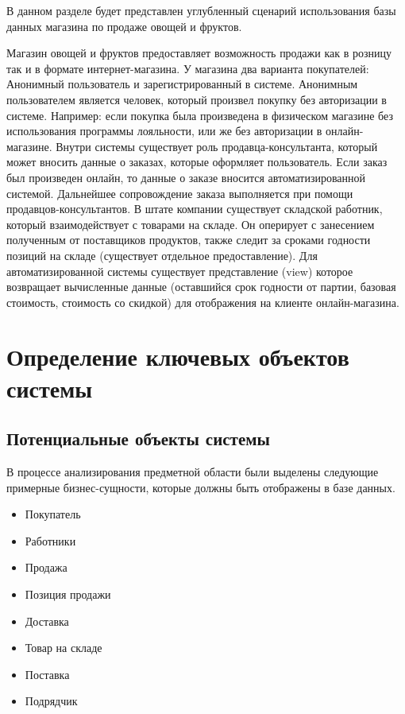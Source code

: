 \documentclass[14pt]{extreport}
\begin{document}
В данном разделе будет представлен углубленный сценарий использования базы данных магазина по продаже овощей и фруктов.


Магазин овощей и фруктов предоставляет возможность продажи как в розницу так и в формате интернет-магазина. У магазина два варианта покупателей: Анонимный пользователь и зарегистрированный в системе. Анонимным пользователем является человек, который произвел покупку без авторизации в системе. Например: если покупка была произведена в физическом магазине без использования программы лояльности, или же без авторизации в онлайн-магазине. Внутри системы существует роль продавца-консультанта, который может вносить данные о заказах, которые оформляет пользователь. Если заказ был произведен онлайн, то данные о заказе вносится автоматизированной системой. Дальнейшее сопровождение заказа выполняется при помощи продавцов-консультантов. В штате компании существует складской работник, который взаимодействует с товарами на складе. Он оперирует с занесением полученным от поставщиков продуктов, также следит за сроками годности позиций на складе (существует отдельное предоставление). Для автоматизированной системы существует представление (view) которое возвращает вычисленные данные (оставшийся срок годности от партии, базовая стоимость, стоимость со скидкой) для отображения на клиенте онлайн-магазина.

\chapter{Определение ключевых объектов системы}

    \section{Потенциальные объекты системы}
        В процессе анализирования предметной области были выделены следующие примерные бизнес-сущности, которые должны быть отображены в базе данных.

        \begin{itemize}
            \item Покупатель
            \item Работники
            \item Продажа
            \item Позиция продажи
            \item Доставка
            \item Товар на складе
            \item Поставка
            \item Подрядчик
        \end{itemize}
    
\end{document}
